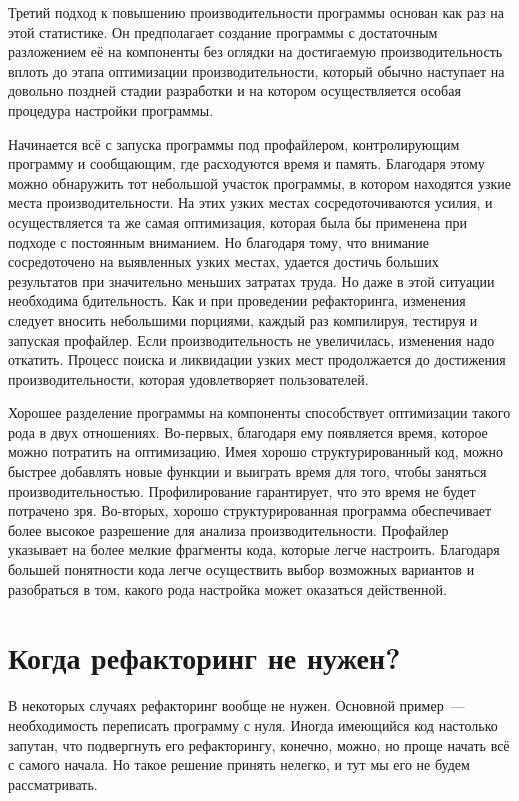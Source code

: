 \documentclass{../../text-style}
\begin{document}
Третий подход к повышению производительности программы основан как раз на этой статистике. Он предполагает создание программы с достаточным разложением её на компоненты без оглядки на достигаемую производительность вплоть до этапа оптимизации производительности, который обычно наступает на довольно поздней стадии разработки и на котором осуществляется особая процедура настройки программы.

Начинается всё с запуска программы под профайлером, контролирующим программу и сообщающим, где расходуются время и память. Благодаря этому можно обнаружить тот небольшой участок программы, в котором находятся узкие места производительности. На этих узких местах сосредоточиваются усилия, и осуществляется та же самая оптимизация, которая была бы применена при подходе с постоянным вниманием. Но благодаря тому, что внимание сосредоточено на выявленных узких местах, удается достичь больших результатов при значительно меньших затратах труда. Но даже в этой ситуации необходима бдительность. Как и при проведении рефакторинга, изменения следует вносить небольшими порциями, каждый раз компилируя, тестируя и запуская профайлер. Если производительность не увеличилась, изменения надо откатить. Процесс поиска и ликвидации узких мест продолжается до достижения производительности, которая удовлетворяет пользователей.

Хорошее разделение программы на компоненты способствует оптимизации такого рода в двух отношениях. Во-первых, благодаря ему появляется время, которое можно потратить на оптимизацию. Имея хорошо структурированный код, можно быстрее добавлять новые функции и выиграть время для того, чтобы заняться производительностью. Профилирование гарантирует, что это время не будет потрачено зря. Во-вторых, хорошо структурированная программа обеспечивает более высокое разрешение для анализа производительности. Профайлер указывает на более мелкие фрагменты кода, которые легче настроить. Благодаря большей понятности кода легче осуществить выбор возможных вариантов и разобраться в том, какого рода настройка может оказаться действенной.

\section{Когда рефакторинг не нужен?}

В некоторых случаях рефакторинг вообще не нужен. Основной пример~--- необходимость переписать программу с нуля. Иногда имеющийся код настолько запутан, что подвергнуть его рефакторингу, конечно, можно, но проще начать всё с самого начала. Но такое решение принять нелегко, и тут мы его не будем рассматривать.
\end{document}
